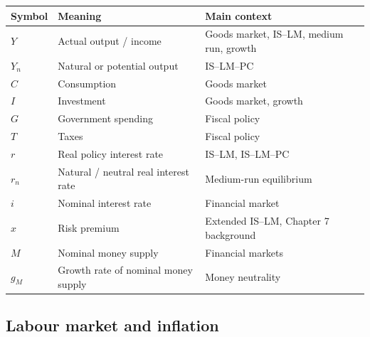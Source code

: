 \documentclass[12pt]{article}
\begin{document}
\begin{center}
\renewcommand{\arraystretch}{1.2}
\begin{tabular}{|p{2.0cm}|p{8.0cm}|p{4.8cm}|}
\hline
\textbf{Symbol} & \textbf{Meaning} & \textbf{Main context} \\
\hline
\(Y\) & Actual output / income & Goods market, IS--LM, medium run, growth \\
\hline
\(Y_n\) & Natural or potential output & IS--LM--PC \\
\hline
\(C\) & Consumption & Goods market \\
\hline
\(I\) & Investment & Goods market, growth \\
\hline
\(G\) & Government spending & Fiscal policy \\
\hline
\(T\) & Taxes & Fiscal policy \\
\hline
\(r\) & Real policy interest rate & IS--LM, IS--LM--PC \\
\hline
\(r_n\) & Natural / neutral real interest rate & Medium-run equilibrium \\
\hline
\(i\) & Nominal interest rate & Financial market \\
\hline
\(x\) & Risk premium & Extended IS--LM, Chapter 7 background \\
\hline
\(M\) & Nominal money supply & Financial markets \\
\hline
\(g_M\) & Growth rate of nominal money supply & Money neutrality \\
\hline
\end{tabular}
\end{center}

\subsection*{Labour market and inflation}
\end{document}
